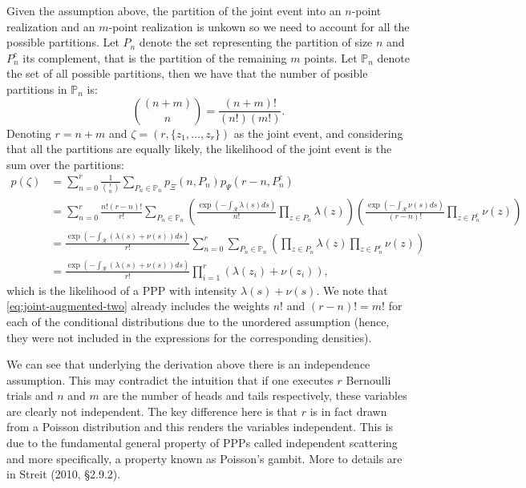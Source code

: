 \documentclass{article}
\newcommand{\calR}{\mathcal{R}}
\newcommand{\ls}{\lambda(s)}
\newcommand{\ns}{\nu(s)}
\newcommand{\bbP}{\mathbb{P}}
\begin{document}
	Given the assumption above, the partition of the joint event into an $n$-point realization and an $m$-point realization is unkown so we need to account for all the possible partitions. Let $P_n$ denote the set representing the partition of size $n$ and $P_n^c$ its complement, that is the partition of the remaining $m$ points. Let $\bbP_n$ denote the set of all possible partitions, then we have that the number of posible partitions in $\bbP_n$ is: 
	\begin{equation}
		 {(n+m) \choose n} = \frac{(n+m)!}{(n!) (m!)}  \text{.}
	\end{equation}
	Denoting $r=n + m$ and $\zeta = (r, \{z_1, \ldots, z_r\})$ as the joint event, and considering that all the partitions are equally likely,  the likelihood of the joint event is the sum over the partitions:
	\begin{align}
		p(\zeta) &= \sum_{n=0}^r \frac{1}{{r \choose n }} \sum_{P_n \in \bbP_n} p_{\Xi}(n, P_n)  p_{\Psi}(r-n, P_n^c ) \\
		&= \sum_{n=0}^r  \frac{n! (r-n)!}{r!} \sum_{P_n \in \bbP_n} 
		\label{eq:joint-augmented-two}
		\left( \frac{ \exp\left(-\int_{\calR} \ls ds\right) }{n!} \prod_{z \in P_n} \lambda(z) \right)
		\left(  \frac{ \exp\left(-\int_{\calR} \ns ds\right) }{(r-n)!}  \prod_{z \in P_n^c} \nu(z) \right) \\
		&= \frac{ \exp\left(-\int_{\calR} (\ls + \ns) ds\right) }{r!}  \sum_{n=0}^r  \sum_{P_n \in \bbP_n} \left(  \prod_{z \in P_n} \lambda(z)    \prod_{z \in P_n^c} \nu(z) \right)\\
		& =  \frac{ \exp\left(-\int_{\calR} (\ls + \ns) ds\right) }{r!}   \prod_{i=1}^r (  \lambda(z_i) + \nu(z_i) ) \text{,}
	\end{align}
	which is the likelihood of a \gls{PPP} with intensity $\lambda(s) + \nu(s)$.  We note that \cref{eq:joint-augmented-two} already includes the weights $n!$ and $(r-n)! = m!$ for each of the conditional distributions due to the unordered assumption (hence, they were not included in the expressions for the corresponding densities). 
	 
	 We can see that underlying the derivation above there is an independence assumption. This may contradict the intuition that if one executes $r$ Bernoulli trials and $n$ and $m$ are the number of heads and tails respectively, these variables are clearly not independent.  The key difference here is that $r$ is in fact drawn from a Poisson distribution and this renders the variables independent. This is due to the fundamental general property of \glspl{PPP} called independent scattering and more specifically, a property known  as Poisson's gambit. More to details are in Streit (2010, \S 2.9.2).  
	  
\end{document}
